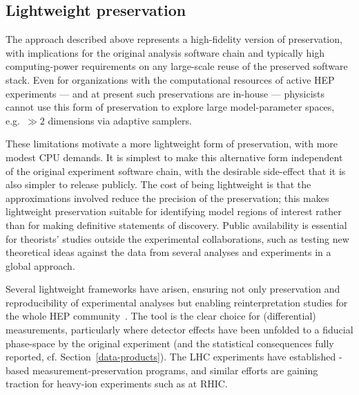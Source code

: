 \documentclass[11pt]{article}
\begin{document}


\subsection{Lightweight preservation}

The approach described above represents a high-fidelity version of preservation, with implications for the original analysis software chain and typically high computing-power requirements on any large-scale reuse of the preserved software stack. Even for organizations with the computational resources of active HEP experiments --- and at present such preservations are in-house --- physicists cannot use this form of preservation to explore large model-parameter spaces, e.g.~$\gg 2$ dimensions via adaptive samplers.

These limitations motivate a more lightweight form of preservation, with more modest CPU demands. It is simplest to make this alternative form independent of the original experiment software chain, with the desirable side-effect that it is also simpler to release publicly. The cost of being lightweight is that the approximations involved reduce the precision of the preservation; this makes lightweight preservation suitable for identifying model regions of interest rather than for making definitive statements of discovery. Public availability is essential for theorists' studies outside the experimental collaborations, such as testing new theoretical ideas against the data from several analyses and experiments in a global approach.

Several lightweight frameworks have arisen, ensuring not only preservation and reproducibility of experimental analyses but enabling reinterpretation studies for the whole HEP community~\cite{LHCReinterpretationForum:2020xtr}. The \rivet tool is the clear choice for (differential) measurements, particularly where detector effects have been unfolded to a fiducial phase-space by the original experiment (and the statistical consequences fully reported, cf. Section~\ref{data-products}). The LHC experiments have established \rivet-based measurement-preservation programs, and similar efforts are gaining traction for heavy-ion experiments such as at RHIC.
\end{document}
